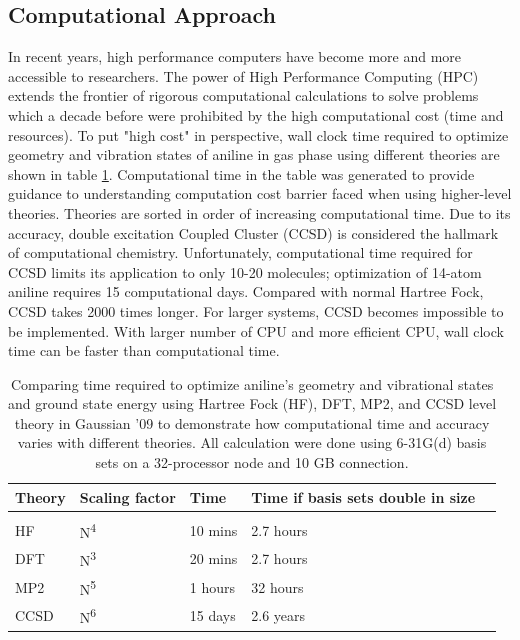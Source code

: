 \documentclass[
journal=jpcbfk, %
manuscript=article]{achemso}
\begin{document}
	\subsection{Computational Approach}
	In  recent years, high performance computers have become more and more accessible to researchers.\cite{Dykstra2011} The power of High Performance Computing (HPC) extends the frontier of rigorous computational calculations to solve problems which a decade before were prohibited by the high computational cost (time and resources). To put "high cost" in perspective, wall clock time required to optimize geometry and vibration states of aniline in gas phase using different theories are shown in table \ref{Table:comparisionTheories}. Computational time in the table was generated to provide guidance to understanding computation cost barrier faced when using higher-level theories. Theories are sorted in order of increasing computational time. Due to its accuracy, double excitation Coupled Cluster (CCSD)\cite{Bartlett1978,Pople1978} is considered the hallmark of computational chemistry. Unfortunately, computational time required for CCSD limits its application to only 10-20 molecules; optimization of 14-atom aniline requires 15 computational days. Compared with normal Hartree Fock, CCSD takes 2000 times longer. For larger systems, CCSD becomes impossible to be implemented. With larger number of CPU and more efficient CPU, wall clock time can be faster than computational time. 
	\begin{table}[ht]
		\centering
		\caption{Comparing time required to optimize aniline's geometry and vibrational states and ground state energy using Hartree Fock (HF), DFT, MP2, and CCSD level theory in Gaussian '09\cite{gaussian} to demonstrate how computational time and accuracy varies with different theories. All calculation were done using 6-31G(d) basis sets on a 32-processor node and 10 GB connection.}\label{Table:comparisionTheories}
		\centering
		\begin{tabular}{lllll}
			Theory   & Scaling factor    & Time     &  Time if basis sets double in size   \\ [0.5ex]
			\hline\hline
			\\[-0.5ex]
			HF	&	N\textsuperscript{4} & 10 mins	& 2.7 hours   \\
			DFT & N\textsuperscript{3} & 20 mins	& 2.7 hours  \\
			MP2 & N\textsuperscript{5} & 1 hours  & 32 hours  \\
			CCSD & N\textsuperscript{6} & 15 days & 2.6 years	 \\
		\end{tabular}
	\end{table}
\end{document}
